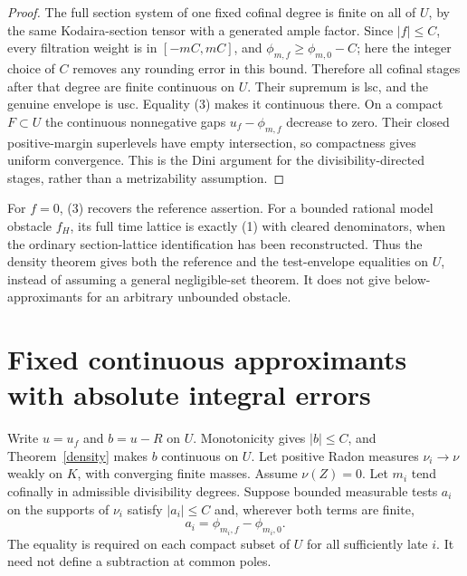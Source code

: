 \documentclass[11pt]{article}
\begin{document}
\begin{proof}
The full section system of one fixed cofinal degree is finite on all
of $U$, by the same Kodaira-section tensor with a generated ample
factor. Since $|f|\leq C$, every filtration weight is in
$[-mC,mC]$, and $\phi_{m,f}\geq\phi_{m,0}-C$; here the integer
choice of $C$ removes any rounding error in this bound. Therefore
all cofinal stages after that degree are finite continuous on $U$.
Their supremum is lsc, and the genuine envelope is usc. Equality (3)
makes it continuous there. On a compact $F\subset U$ the continuous
nonnegative gaps $u_f-\phi_{m,f}$ decrease to zero. Their closed
positive-margin superlevels have empty intersection, so compactness
gives uniform convergence. This is the Dini argument for the
divisibility-directed stages, rather than a metrizability assumption.
\end{proof}

For $f=0$, (3) recovers the reference assertion. For a bounded rational
model obstacle $f_H$, its full time lattice is exactly (1) with cleared
denominators, when the ordinary section-lattice identification has
been reconstructed. Thus the density theorem gives both the reference
and the test-envelope equalities on $U$, instead of assuming a
general negligible-set theorem. It does not give below-approximants
for an arbitrary unbounded obstacle.

\section{Fixed continuous approximants with absolute integral errors}
Write $u=u_f$ and $b=u-R$ on $U$. Monotonicity gives $|b|\leq C$,
and Theorem~\ref{density} makes $b$ continuous on $U$.
Let positive Radon measures $\nu_i\to\nu$ weakly on $K$, with
converging finite masses. Assume $\nu(Z)=0$.
Let $m_i$ tend cofinally in admissible divisibility degrees. Suppose
bounded measurable tests $a_i$ on the supports of $\nu_i$ satisfy
$|a_i|\leq C$ and, wherever both terms are finite,
\[
                  a_i=\phi_{m_i,f}-\phi_{m_i,0}.          \tag{6}
\]
The equality is required on each compact subset of $U$ for all
sufficiently late $i$. It need not define a subtraction at common poles.
\end{document}
